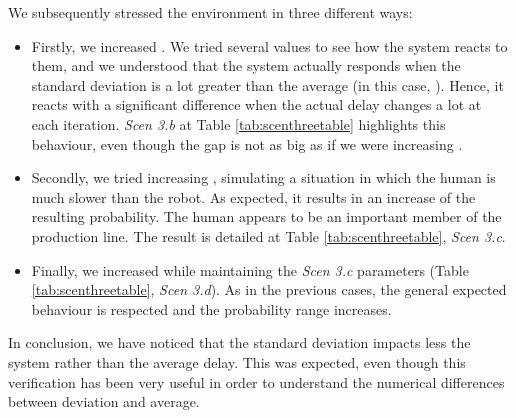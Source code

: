 We subsequently stressed the environment in three different ways:
\begin{itemize}
    \item Firstly, we increased \vT. We tried several values to see how the system reacts to them, and we understood that the system actually responds when the standard deviation is a lot greater than the average (in this case, \mT). Hence, it reacts with a significant difference when the actual delay changes a lot at each iteration. \emph{Scen 3.b} at Table \ref{tab:scenthreetable} highlights this behaviour, even though the gap is not as big as if we were increasing \mT.
    \item Secondly, we tried increasing \mH, simulating a situation in which the human is much slower than the robot. As expected, it results in an increase of the resulting probability. The human appears to be an important member of the production line. The result is detailed at Table \ref{tab:scenthreetable}, \emph{Scen 3.c}.
    \item Finally, we increased \vH while maintaining the \emph{Scen 3.c} parameters (Table \ref{tab:scenthreetable}, \emph{Scen 3.d}). As in the previous cases, the general expected behaviour is respected and the probability range increases.
\end{itemize}

In conclusion, we have noticed that the standard deviation impacts less the system rather than the average delay. This was expected, even though this verification has been very useful in order to understand the numerical differences between deviation and average.
